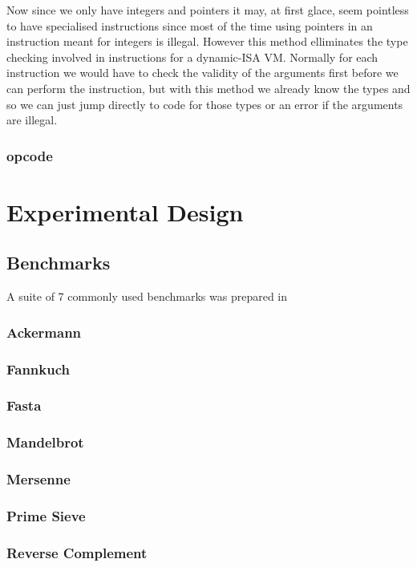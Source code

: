 \documentclass[english,a4paper]{article}
\begin{document}
Now since we only have integers and pointers it may, at first glace,
seem pointless to have specialised instructions since most of the time
using pointers in an instruction meant for integers is
illegal. However this method elliminates the type checking involved in
instructions for a dynamic-ISA VM. Normally for each instruction we
would have to check the validity of the arguments first before we can
perform the instruction, but with this method we already know the
types and so we can just jump directly to code for those types or an
error if the arguments are illegal.

\subsubsection{opcode}

\section{Experimental Design}

\subsection{Benchmarks}

A suite of 7 commonly used benchmarks was prepared in 

\subsubsection{Ackermann}
\subsubsection{Fannkuch}
\subsubsection{Fasta}
\subsubsection{Mandelbrot}
\subsubsection{Mersenne}
\subsubsection{Prime Sieve}
\subsubsection{Reverse Complement}
\end{document}
